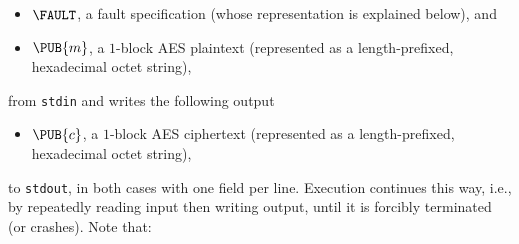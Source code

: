 \documentclass[crop={false},multi={true},tikz={true}]{standalone}
\begin{document}
\begin{itemize}
\item $\FAULT$, 
      a  fault specification
      (whose representation is explained below),
      and
\item $\PUB{m}$,
      a  ${1}$-block AES plaintext
      (represented as a  length-prefixed, hexadecimal octet   string),
\end{itemize}

\noindent
from \lstinline[language={bash}]{stdin} and writes the following output

\begin{itemize}
\item $\PUB{c}$,
      a  ${1}$-block AES ciphertext
      (represented as a  length-prefixed, hexadecimal octet   string),
\end{itemize}

\noindent
to \lstinline[language={bash}]{stdout}, in both cases with one field per 
line.  Execution continues this way, i.e., by repeatedly reading input 
then writing output, until it is forcibly terminated (or crashes).  
Note that:
\end{document}
